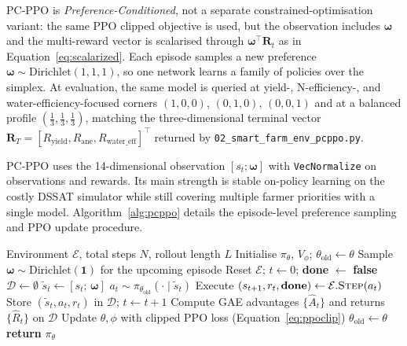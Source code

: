 PC-PPO is \emph{Preference-Conditioned}, not a separate constrained-optimisation
variant: the same PPO clipped objective is used, but the observation includes
$\boldsymbol{\omega}$ and the multi-reward vector is scalarised through
$\boldsymbol{\omega}^{\top}\mathbf{R}_t$ as in Equation~\eqref{eq:scalarized}.
Each episode samples a new preference $\boldsymbol{\omega}\sim\mathrm{Dirichlet}(1,1,1)$,
so one network learns a family of policies over the simplex. At evaluation,
the same model is queried at yield-, N-efficiency-, and water-efficiency-focused
corners $(1,0,0)$, $(0,1,0)$, $(0,0,1)$ and at a balanced profile
$(\tfrac{1}{3},\tfrac{1}{3},\tfrac{1}{3})$, matching the three-dimensional
terminal vector $\mathbf{R}_T=[R_{\text{yield}}, R_{\text{ane}}, R_{\text{water\_eff}}]^\top$
returned by \texttt{02\_smart\_farm\_env\_pcppo.py}.

PC-PPO uses the 14-dimensional observation
$[s_t;\boldsymbol{\omega}]$ with \texttt{VecNormalize} on observations and rewards.
Its main strength is stable on-policy learning on the costly DSSAT simulator while
still covering multiple farmer priorities with a single model.
Algorithm~\ref{alg:pcppo} details the episode-level preference sampling and
PPO update procedure.

\begin{algorithm}[ht]
\caption{Preference-Conditioned PPO (PC-PPO)}
\label{alg:pcppo}
\begin{algorithmic}[1]
\Require Environment $\mathcal{E}$, total steps $N$, rollout length $L$
\State Initialise $\pi_\theta$, $V_\phi$; $\theta_{\text{old}} \leftarrow \theta$
  \State Sample $\boldsymbol{\omega} \sim \mathrm{Dirichlet}(\mathbf{1})$ for the upcoming episode
  \State Reset $\mathcal{E}$; $t \leftarrow 0$; \textbf{done} $\leftarrow$ \textbf{false}
  \State $\mathcal{D} \leftarrow \emptyset$
    \State $\tilde{s}_t \leftarrow [s_t;\,\boldsymbol{\omega}]$
    \State $a_t \sim \pi_{\theta_{\text{old}}}(\cdot \mid \tilde{s}_t)$
    \State Execute $(s_{t+1}, r_t, \textbf{done}) \leftarrow \mathcal{E}.\textsc{Step}(a_t)$
    \State Store $(\tilde{s}_t, a_t, r_t)$ in $\mathcal{D}$; $t \leftarrow t + 1$
  \EndWhile
  \State Compute GAE advantages $\{\hat{A}_t\}$ and returns $\{\hat{R}_t\}$ on $\mathcal{D}$
      \State Update $\theta, \phi$ with clipped PPO loss (Equation~\eqref{eq:ppoclip})
    \EndFor
  \EndFor
  \State $\theta_{\text{old}} \leftarrow \theta$
\EndWhile
\State \textbf{return} $\pi_\theta$
\end{algorithmic}
\end{algorithm}



